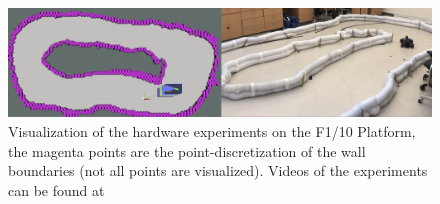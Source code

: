 \documentclass[manuscript,screen,review]{acmart}
\newcommand{\ttj}[1]{\textcolor{red}{\textbf{\underline{TTJ:}} #1}}
\begin{document}


\begin{figure}[ht]%
  \centering
  \includegraphics[width=\linewidth]{figures/sidebyside.png}
  \caption{Visualization of the hardware experiments on the F1/10 Platform, the magenta points are the point-discretization of the wall boundaries (not all points are visualized). Videos of the experiments can be found at}
  \label{fig:lab_setup}
\end{figure}%
\end{document}
